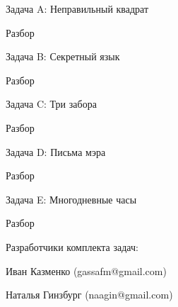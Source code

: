 \documentclass[12pt,a4paper,oneside,twocolumn,landscape]{article}
\newcommand{\sols}[3]%
{

\smallskip


%
%

\bigskip
#3
{\Large Разбор}
\smallskip


}
\begin{document}
\raggedbottom

{\LARGE Задача A: {Неправильный квадрат}}

\sols{abt}{0211}{}

\bigskip
{\LARGE Задача B: {Секретный язык}}

\sols{berg}{0212}{}

\bigskip
\newpage
{\LARGE Задача C: {Три забора}}

\sols{cord}{0213}{}

\bigskip
{\LARGE Задача D: {Письма мэра}}

\sols{dorf}{0214}{}

\bigskip
{\LARGE Задача E: {Многодневные часы}}

\sols{erd}{0215}{\newpage}

\bigskip

{\Large Разработчики комплекта задач:}

Иван Казменко (gassafm@gmail.com)

Наталья Гинзбург (naagin@gmail.com)
\end{document}
